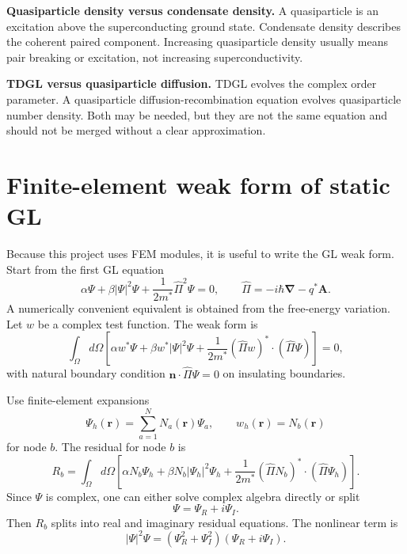 \documentclass[11pt]{article}
\numberwithin{equation}{section}
\newcommand{\rvec}{\bm{r}}
\newcommand{\Avec}{\bm{A}}
\newcommand{\nvec}{\bm{n}}
\renewcommand{\grad}{\bm{\nabla}}
\newcommand{\Ord}{\Psi}
\begin{document}
\begin{physicsbox}
\textbf{Quasiparticle density versus condensate density.} A quasiparticle is an excitation above the superconducting ground state. Condensate density describes the coherent paired component. Increasing quasiparticle density usually means pair breaking or excitation, not increasing superconductivity.
\end{physicsbox}

\begin{physicsbox}
\textbf{TDGL versus quasiparticle diffusion.} TDGL evolves the complex order parameter. A quasiparticle diffusion-recombination equation evolves quasiparticle number density. Both may be needed, but they are not the same equation and should not be merged without a clear approximation.
\end{physicsbox}

\section{Finite-element weak form of static GL}

Because this project uses FEM modules, it is useful to write the GL weak form. Start from the first GL equation
\begin{equation}
\alpha\Ord+\beta|\Ord|^2\Ord+\frac{1}{2m^*}\hat{\Pi}^2\Ord=0,
\qquad
\hat{\Pi}=-i\hbar\grad-q^*\Avec.
\end{equation}
A numerically convenient equivalent is obtained from the free-energy variation. Let $w$ be a complex test function. The weak form is
\begin{equation}
\int_\Omega d\Omega\left[\alpha w^*\Ord+\beta w^*|\Ord|^2\Ord+\frac{1}{2m^*}(\hat{\Pi}w)^*\cdot(\hat{\Pi}\Ord)\right]=0,
\label{eq:gl_weak}
\end{equation}
with natural boundary condition $\nvec\cdot\hat{\Pi}\Ord=0$ on insulating boundaries.

Use finite-element expansions
\begin{equation}
\Ord_h(\rvec)=\sum_{a=1}^{N}N_a(\rvec)\Ord_a,
\qquad
w_h(\rvec)=N_b(\rvec)
\end{equation}
for node $b$. The residual for node $b$ is
\begin{equation}
R_b=\int_\Omega d\Omega\left[\alpha N_b\Ord_h+\beta N_b|\Ord_h|^2\Ord_h+\frac{1}{2m^*}(\hat{\Pi}N_b)^*\cdot(\hat{\Pi}\Ord_h)\right].
\end{equation}
Since $\Ord$ is complex, one can either solve complex algebra directly or split
\begin{equation}
\Ord=\Ord_R+i\Ord_I.
\end{equation}
Then $R_b$ splits into real and imaginary residual equations. The nonlinear term is
\begin{equation}
|\Ord|^2\Ord=(\Ord_R^2+\Ord_I^2)(\Ord_R+i\Ord_I).
\end{equation}
\end{document}
